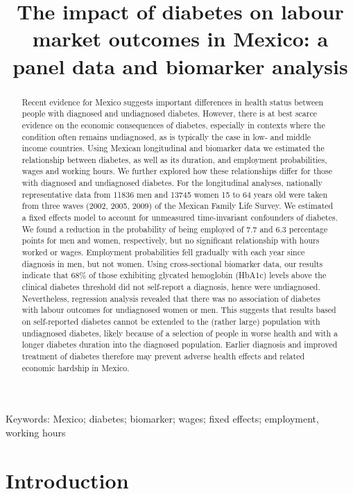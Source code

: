 \documentclass[12pt,english]{article}
\begin{document}
	\title{The impact of diabetes on labour market outcomes in Mexico: a panel data and biomarker analysis}
	\author{}
	\date{}
 \maketitle 
	\thispagestyle{empty}
	\clearpage
	\begin{abstract}
		Recent evidence for Mexico suggests important differences in health status between people with diagnosed and undiagnosed diabetes. However, there is at best scarce evidence on the economic consequences of diabetes, especially in contexts where the condition often remains undiagnosed, as is typically the case in low- and middle income countries. Using Mexican longitudinal and biomarker data we estimated the relationship between diabetes, as well as its duration, and employment probabilities, wages and working hours. We further explored how these relationships differ for those with diagnosed and undiagnosed diabetes. For the longitudinal analyses, nationally representative data from 11836 men and 13745 women 15 to 64 years old were taken from three waves (2002, 2005, 2009) of the Mexican Family Life Survey. We estimated a fixed effects model to account for unmeasured time-invariant confounders of diabetes. We found a reduction in the probability of being employed of 7.7 and 6.3 percentage points for men and women, respectively, but no significant relationship with hours worked or wages. Employment probabilities fell gradually with each year since diagnosis in men, but not women. Using cross-sectional biomarker data, our results indicate that 68\% of those exhibiting glycated hemoglobin (HbA1c) levels above the clinical diabetes threshold did not self-report a diagnosis, hence were undiagnosed. Nevertheless, regression analysis revealed that there was no association of diabetes with labour outcomes for undiagnosed women or men. This suggests that results based on self-reported diabetes cannot be extended to the (rather large) population with undiagnosed diabetes, likely because of a selection of people in worse health and with a longer diabetes duration into the diagnosed  population. Earlier diagnosis and improved treatment of diabetes therefore may prevent adverse health effects and related economic hardship in Mexico.
	\end{abstract}
\noindent Keywords: Mexico; diabetes; biomarker; wages; fixed effects; employment, working hours


\section{\label{sec:Introduction}Introduction }
\end{document}
